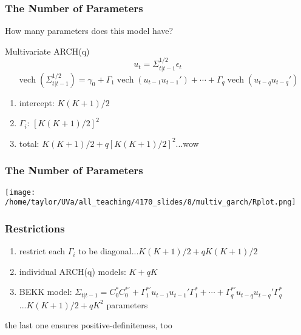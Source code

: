 \documentclass{beamer}
\begin{document}
\begin{frame}
\frametitle{The Number of Parameters}

How many parameters does this model have?

\begin{block}{ Multivariate ARCH(q)}
\[
u_t = \Sigma_{t|t-1}^{1/2}\epsilon_t
\]
\[
\operatorname{vech}\left( \Sigma_{t|t-1}^{1/2} \right)= \gamma_0 + \Gamma_1 \operatorname{vech}(u_{t-1} u_{t-1}') + \cdots + \Gamma_q\operatorname{vech}(u_{t-q} u_{t-q}')
\]
\end{block}
\pause

\begin{enumerate}
\item intercept: $K(K+1)/2$
\item $\Gamma_i$: $[K(K+1)/2]^2$
\item total: $K(K+1)/2 + q [K(K+1)/2]^2$...wow
\end{enumerate}

\end{frame}


\begin{frame}
\frametitle{The Number of Parameters}

\begin{center}
\texttt{[image: /home/taylor/UVa/all\_teaching/4170\_slides/8/multiv\_garch/Rplot.png]}
\end{center}

\end{frame}


\begin{frame}
\frametitle{Restrictions}

\begin{enumerate}
\item restrict each $\Gamma_i$ to be diagonal...$K(K+1)/2 + q K(K+1)/2$
\item individual ARCH(q) models: $K + qK$
\item BEKK model: $\Sigma_{t|t-1} = C_0^*C_0^{*'} + \Gamma_1^{*'}u_{t-1}u_{t-1}' \Gamma_1^{*} + \cdots + \Gamma_q^{*'}u_{t-q}u_{t-q}' \Gamma_q^{*}$\\...$K(K+1)/2 + q K^2$ parameters
\end{enumerate}
the last one ensures positive-definiteness, too
\end{frame}
\end{document}
